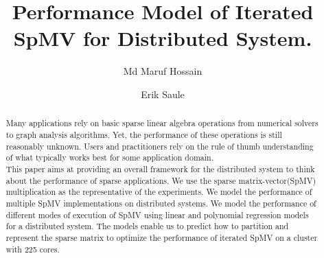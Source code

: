 \documentclass[sigconf,review,anonymous]{acmart}
\begin{document}
%
\newcommand{\todo}[1]{\color{red}\textbf{\hl{#1}}\color{black}\xspace}
\newcommand{\rom}[1]{\expandafter{\romannumeral #1\relax}}
%
\title{Performance Model of Iterated SpMV for Distributed System.}

\author{Md Maruf Hossain}

\author{Erik Saule}

\begin{abstract}
Many applications rely on basic sparse linear algebra operations from numerical solvers to graph analysis 
algorithms. Yet, the performance of these operations is still reasonably unknown. Users and practitioners 
rely on the rule of thumb understanding of what typically works best for some application domain.
\\ 
This paper aims at providing an overall framework for the distributed system to think about the performance 
of sparse applications. We use the sparse matrix-vector(SpMV) multiplication as the representative of the 
experiments. We model the performance of multiple SpMV implementations on distributed systems. 
 We model the performance of different modes of execution of SpMV using linear and polynomial regression models for a distributed system. 
 The models enable us to predict how to partition and represent the sparse matrix to optimize the performance of iterated SpMV on a cluster with 225 cores.
\end{abstract}
%


%
\maketitle
\end{document}
